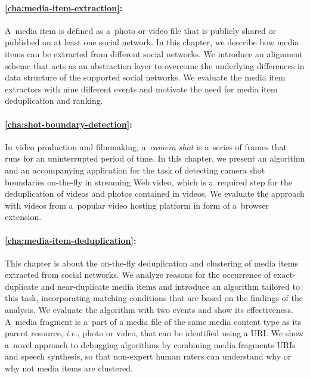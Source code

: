 \paragraph{\autoref{cha:media-item-extraction}:}

A~media item is defined as
a~photo or video file that is publicly shared or published
on at least one social network.
In this chapter, we describe how media items can be extracted
from different social networks.
We introduce an alignment scheme that acts as an abstraction layer
to overcome the underlying differences in data structure of
the supported social networks.
We evaluate the media item extractors with nine different events
and motivate the need for media item deduplication and ranking.

\paragraph{\autoref{cha:shot-boundary-detection}:}

In video production and filmmaking, a~\emph{camera shot} is a~series of frames
that runs for an uninterrupted period of time.
In this chapter, we present an algorithm and an
accompanying application for the task of detecting
camera shot boundaries on-the-fly in streaming Web video,
which is a~required step for the deduplication of videos
and photos contained in videos.
We evaluate the approach with videos from a~popular video hosting platform in form of a~browser extension.

\paragraph{\autoref{cha:media-item-deduplication}:}

This chapter is about the on-the-fly deduplication and clustering
of media items extracted from social networks.
We analyze reasons for the occurrence of exact-duplicate
and near-duplicate media items and introduce an algorithm
tailored to this task, incorporating matching conditions
that are based on the findings of the analysis.
We evaluate the algorithm with two events
and show its effectiveness.
A~media fragment is a~part of a media file
of the same media content type
as its parent resource, \emph{i.e.}, photo or video,
that can be identified using a URI.
We show a~novel approach to debugging algorithms
by combining media fragments URIs and speech synthesis,
so that non-expert human raters can understand why or why not
media items are clustered.

